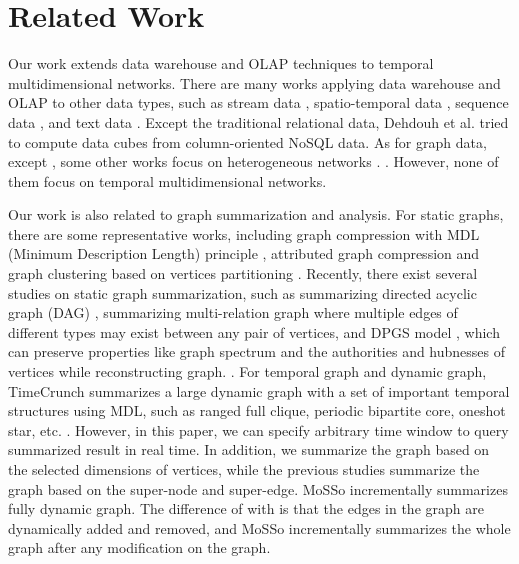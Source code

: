 \documentclass[10pt,journal,compsoc]{IEEEtran}
\begin{document}
\section{Related Work} \label{sec:related_work}
Our work extends data warehouse and OLAP techniques to temporal multidimensional networks. There are many works applying data warehouse and OLAP to other data types, such as stream data \cite{han2005stream}, spatio-temporal data \cite{gomez2009survey}, sequence data \cite{lo2008olap,liu2011cube}, and text data \cite{lin2008text}. Except the traditional relational data, Dehdouh et al. \cite{dehdouh2014columnar} tried to compute data cubes from column-oriented NoSQL data. As for graph data, except \cite{zhao2011graph}, some other works focus on heterogeneous networks \cite{yin2012hmgraph,wang2015tsmh}. . However, none of them focus on temporal multidimensional networks.

Our work is also related to graph summarization and analysis. For static graphs, there are some representative works, including graph compression with MDL (Minimum Description Length) principle \cite{navlakha2008graph}, attributed graph compression \cite{wu2014graph} and graph clustering based on vertices partitioning \cite{zhou2009graph}. Recently, there exist several studies on static graph summarization, such as summarizing directed acyclic graph (DAG) \cite{zhu2020top}, summarizing multi-relation graph \cite{ke2022multi} where multiple edges of different types may exist between any pair of vertices, and DPGS model \cite{zhou2021dpgs}, which can preserve properties like graph spectrum and the authorities and hubnesses of vertices while reconstructing graph. . For temporal graph and dynamic graph, TimeCrunch \cite{shah2015timecrunch} summarizes a large dynamic graph with a set of important temporal structures using MDL, such as ranged full clique, periodic bipartite core, oneshot star, etc. . However, in this paper, we can specify arbitrary time window to query summarized result in real time. In addition, we summarize the graph based on the selected dimensions of vertices, while the previous studies summarize the graph based on the super-node and super-edge. MoSSo \cite{} incrementally summarizes fully dynamic graph. The difference of \cite{ko2020incremental} with \cite{fernandes2018dynamic,tsalouchidou2018scalable} is that the edges in the graph are dynamically added and removed, and MoSSo incrementally summarizes the whole graph after any modification on the graph.
\end{document}
